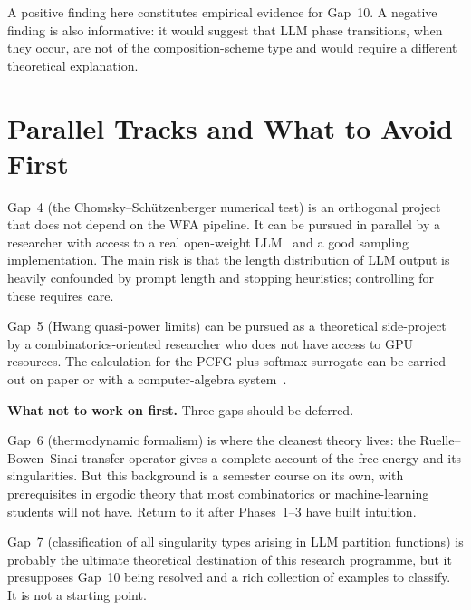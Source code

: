 A positive finding here constitutes empirical evidence for Gap~10.  A
negative finding is also informative: it would suggest that LLM phase
transitions, when they occur, are not of the composition-scheme type
and would require a different theoretical explanation.

\section{Parallel Tracks and What to Avoid First}
\label{ch19:parallel}

Gap~4 (the Chomsky--Schützenberger numerical test) is an orthogonal
project that does not depend on the WFA pipeline.  It can be pursued
in parallel by a researcher with access to a real open-weight
LLM~\cite{BlondelEtAl2025,DuEtAl2023} and a good sampling implementation.
The main risk is that the length distribution of LLM output is heavily
confounded by prompt length and stopping heuristics; controlling for
these requires care.

Gap~5 (Hwang quasi-power limits) can be pursued as a theoretical
side-project by a combinatorics-oriented researcher who does not have
access to GPU resources.  The calculation for the PCFG-plus-softmax
surrogate can be carried out on paper or with a computer-algebra
system~\cite{Hwang1998}.

\textbf{What not to work on first.}  Three gaps should be deferred.

Gap~6 (thermodynamic formalism) is where the cleanest theory lives:
the Ruelle--Bowen--Sinai transfer operator gives a complete account of
the free energy and its singularities.  But this background is a
semester course on its own, with prerequisites in ergodic theory that
most combinatorics or machine-learning students will not have.  Return
to it after Phases~1--3 have built intuition.

Gap~7 (classification of all singularity types arising in LLM partition
functions) is probably the ultimate theoretical destination of this
research programme, but it presupposes Gap~10 being resolved and a
rich collection of examples to classify.  It is not a starting point.

